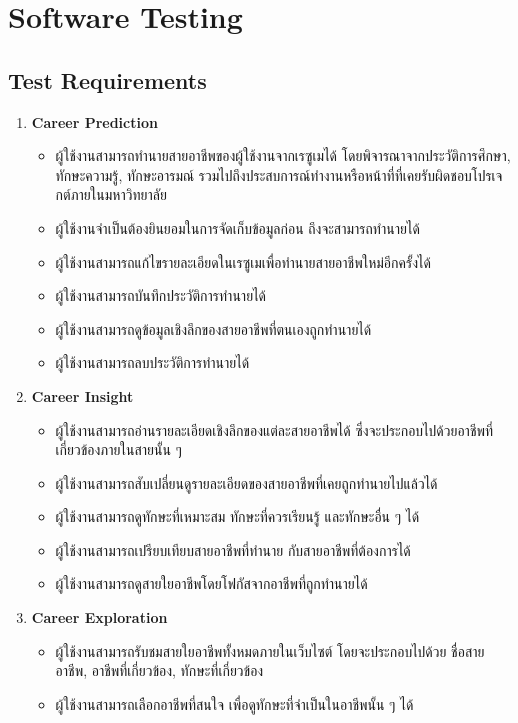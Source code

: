 \section{Software Testing}
\subsection{Test Requirements}
\begin{enumerate}
    \item \textbf{Career Prediction}
          \begin{itemize}
              \item ผู้ใช้งานสามารถทำนายสายอาชีพของผู้ใช้งานจากเรซูเมได้ โดยพิจารณาจากประวัติการศึกษา, ทักษะความรู้, ทักษะอารมณ์ รวมไปถึงประสบการณ์ทำงานหรือหน้าที่ที่เคยรับผิดชอบโปรเจกต์ภายในมหาวิทยาลัย
              \item ผู้ใช้งานจำเป็นต้องยินยอมในการจัดเก็บข้อมูลก่อน ถึงจะสามารถทำนายได้
              \item ผู้ใช้งานสามารถแก้ไขรายละเอียดในเรซูเมเพื่อทำนายสายอาชีพใหม่อีกครั้งได้
              \item ผู้ใช้งานสามารถบันทึกประวัติการทำนายได้
              \item ผู้ใช้งานสามารถดูข้อมูลเชิงลึกของสายอาชีพที่ตนเองถูกทำนายได้
              \item ผู้ใช้งานสามารถลบประวัติการทำนายได้
          \end{itemize}
    \item \textbf{Career Insight}
          \begin{itemize}
              \item ผู้ใช้งานสามารถอ่านรายละเอียดเชิงลึกของแต่ละสายอาชีพได้ ซึ่งจะประกอบไปด้วยอาชีพที่เกี่ยวข้องภายในสายนั้น ๆ
              \item ผู้ใช้งานสามารถสับเปลี่ยนดูรายละเอียดของสายอาชีพที่เคยถูกทำนายไปแล้วได้
              \item ผู้ใช้งานสามารถดูทักษะที่เหมาะสม ทักษะที่ควรเรียนรู้ และทักษะอื่น ๆ ได้
              \item ผู้ใช้งานสามารถเปรียบเทียบสายอาชีพที่ทำนาย กับสายอาชีพที่ต้องการได้
              \item ผู้ใช้งานสามารถดูสายใยอาชีพโดยโฟกัสจากอาชีพที่ถูกทำนายได้
          \end{itemize}
    \item \textbf{Career Exploration}
          \begin{itemize}
              \item ผู้ใช้งานสามารถรับชมสายใยอาชีพทั้งหมดภายในเว็บไซต์ โดยจะประกอบไปด้วย ชื่อสายอาชีพ, อาชีพที่เกี่ยวข้อง, ทักษะที่เกี่ยวข้อง
              \item ผู้ใช้งานสามารถเลือกอาชีพที่สนใจ เพื่อดูทักษะที่จำเป็นในอาชีพนั้น ๆ ได้
          \end{itemize}
\end{enumerate}
\label{sec:test-subsection}
